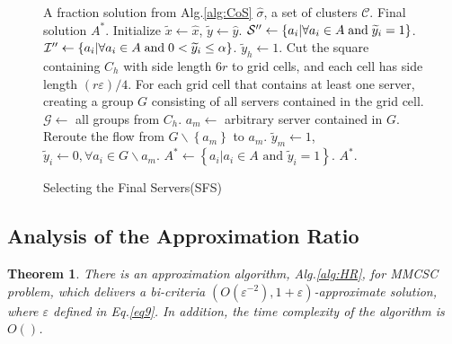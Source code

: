 \documentclass[journal]{IEEEtran}
\newtheorem{theorem}{Theorem}
\begin{document}
\begin{figure}[!t]
	\renewcommand{\algorithmicrequire}{\textbf{Input:}}
	\renewcommand{\algorithmicensure}{\textbf{Output:}}
	\begin{algorithm}[H]
		\caption{Selecting the Final Servers(SFS)}
		\begin{algorithmic}[1]\label{alg:SFS}
			\REQUIRE A fraction solution from Alg.\ref{alg:CoS} $\widehat{\sigma}$, a set of clusters $\mathcal{C}$.
			\ENSURE Final solution $A^*$.
			\STATE Initialize $\widetilde x \leftarrow \widehat x$, $\widetilde y \leftarrow \widehat y$.
			\STATE ${\mathcal{S}''} \leftarrow \left\{ {{a_i}|\forall{a_i} \in A\; {\rm{and}} \; {{\widetilde y}_i} = 1} \right\}$.
			\STATE ${\mathcal{I}''} \leftarrow \left\{ {{a_i}|\forall{a_i} \in A\; {\rm{and}} \; 0<{{\widetilde y}_i} \le \alpha} \right\}$.
			\STATE $\widetilde{y}_h \leftarrow 1$.
			\ELSE
			\STATE Cut the square containing $C_h$ with side length $6r$ to grid cells, and each cell has side length $(r\varepsilon)/4$.
			\STATE For each grid cell that contains at least one server, creating a group $G$ consisting of all servers contained in the grid cell.
			\STATE $\mathcal{G} \leftarrow$ all groups from $C_h$. 
			\STATE $a_m \leftarrow $ arbitrary server contained in $G$.
			\STATE Reroute the flow from $G\backslash \left\{a_m\right\}$ to $a_m$.
			\STATE $\widetilde{y}_m \leftarrow 1$, $\widetilde{y}_i \leftarrow 0, \forall a_i \in G\backslash{a_m}$.
			\ENDFOR
			\ENDIF
			\ENDFOR
			\STATE $A^* \leftarrow \left\{a_i | a_i\in A \text{ and } \widetilde{y}_i = 1 \right\}$.
			\RETURN $A^* $.
		\end{algorithmic}
	\end{algorithm}
\end{figure}

\subsection{Analysis of the Approximation Ratio}
\begin{theorem}
	There is an approximation algorithm, Alg.\ref{alg:HR}, for MMCSC problem, which delivers a bi-criteria $(O(\varepsilon^{-2}), 1+\varepsilon)$-approximate solution, where $\varepsilon$ defined in Eq.\ref{eq9}. In addition, the time complexity of the algorithm is $O()$.
\end{theorem}
\end{document}
